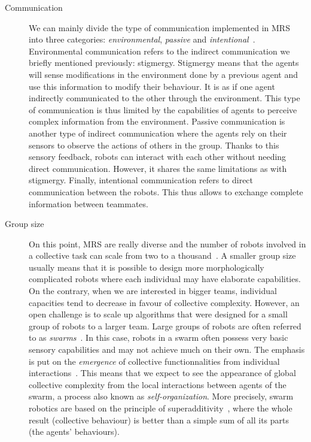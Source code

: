 \begin{description}
      \item[Communication] {We can mainly divide the type of communication implemented in MRS into three categories: \emph{environmental}, \emph{passive} and \emph{intentional}~\parencite{Cao1997, Parker2008}. Environmental communication refers to the indirect communication we briefly mentioned previously: stigmergy. Stigmergy means that the agents will sense modifications in the environment done by a previous agent and use this information to modify their behaviour. It is as if one agent indirectly communicated to the other through the environment. This type of communication is thus limited by the capabilities of agents to perceive complex information from the environment. Passive communication is another type of indirect communication where the agents rely on their sensors to observe the actions of others in the group. Thanks to this sensory feedback, robots can interact with each other without needing direct communication. However, it shares the same limitations as with stigmergy. Finally, intentional communication refers to direct communication between the robots. This thus allows to exchange complete information between teammates.}

      \item[Group size] {On this point, MRS are really diverse and the number of robots involved in a collective task can scale from two to a thousand~\parencite{Rubenstein2014}. A smaller group size usually means that it is possible to design more morphologically complicated robots where each individual may have elaborate capabilities. On the contrary, when we are interested in bigger teams, individual capacities tend to decrease in favour of collective complexity. However, an open challenge is to scale up algorithms that were designed for a small group of robots to a larger team. Large groups of robots are often referred to as \emph{swarms}~\parencite{Beni2005}. In this case, robots in a swarm often possess very basic sensory capabilities and may not achieve much on their own. The emphasis is put on the \emph{emergence} of collective functionnalities from individual interactions~\parencite{Kube1993, Parker2008}. This means that we expect to see the appearance of global collective complexity from the local interactions between agents of the swarm, a process also known as \emph{self-organization}. More precisely, swarm robotics are based on the principle of superadditivity~\parencite{Parker2008}, where the whole result (collective behaviour) is better than a simple sum of all its parts (the agents' behaviours).}
    \end{description}

